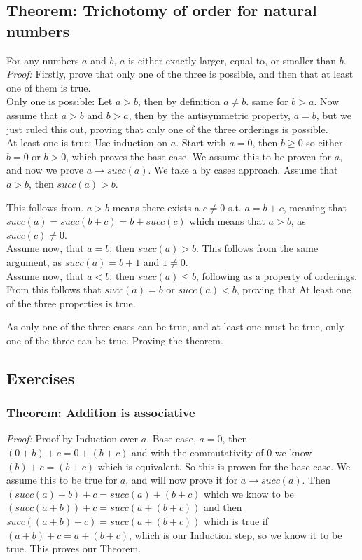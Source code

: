\documentclass[]{scrbook}
\begin{document}
\subsection{Theorem: Trichotomy of order for natural numbers}
For any numbers $a$ and $b$, $a$ is either exactly larger, equal to, or smaller than $b$.\\
\textit{Proof:} Firstly, prove that only one of the three is possible, and then that at least one of them is true.\\
Only one is possible: Let $a > b$, then by definition $a \neq b$. same for $b > a$. Now assume that $a>b$ and $b >a$, then by the antisymmetric property, $a = b$, but we just ruled this out, proving that only one of the three orderings is possible.\\
At least one is true: Use induction on $a$. Start with $a = 0$, then $b \geqslant 0$ so either $ b = 0$ or $b > 0$, which proves the base case. We assume this to be proven for $a$, and now we prove $a\rightarrow succ(a)$. We take a by cases approach. Assume that $a > b$, then $succ(a) > b$.

This follows from. $a > b$ means there exists a $c \neq 0$ s.t. $a = b + c$, meaning that $succ(a) = succ(b + c) = b + succ(c)$ which means that $a > b$, as $succ(c) \neq 0$.\\
Assume now, that $a = b$, then $succ(a) > b$. This follows from the same argument, as $succ(a) = b + 1$ and $1 \neq 0$.\\
Assume now, that $a < b$, then $succ(a) \leqslant b$, following as a property of orderings. From this follows that $succ(a) = b$ or $succ(a) < b$, proving that At least one of the three properties is true.

As only one of the three cases can be true, and at least one must be true, only one of the three can be true. Proving the theorem.

\subsection{Exercises}

\subsubsection*{Theorem: Addition is associative}
\textit{Proof:} Proof by Induction over $a$. Base case, $a = 0$, then $(0 + b) + c = 0 + (b + c)$ and with the commutativity of 0 we know $(b) + c = (b + c)$ which is equivalent. So this is proven for the base case. We assume this to be true for $a$, and will now prove it for $a\rightarrow succ(a)$. Then $(succ(a) + b) + c = succ(a) + (b + c)$ which we know to be $(succ(a + b)) + c = succ(a + (b + c))$ and then $succ((a + b) + c) = succ(a + (b+c))$ which is true if $(a +b) +c = a + (b+c)$, which is our Induction step, so we know it to be true. This proves our Theorem.
\end{document}
